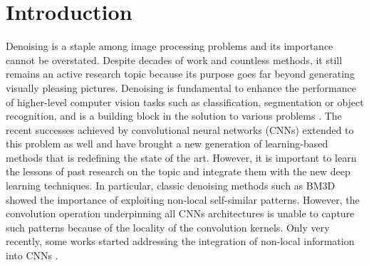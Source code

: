 \documentclass[journal]{IEEEtran}
\begin{document}
\section{Introduction}


Denoising is a staple among image processing problems and its importance cannot be overstated. Despite decades of work and countless methods, it still remains an active research topic because its purpose goes far beyond generating visually pleasing pictures. Denoising is fundamental to enhance the performance of higher-level computer vision tasks such as classification, segmentation or object recognition, and is a building block in the solution to various problems \cite{lukavs2006digital,valsesia2015compressed,romano2017little,sun2019block}. The recent successes achieved by convolutional neural networks (CNNs) extended to this problem as well and have brought a new generation of learning-based methods that is redefining the state of the art. However, it is important to learn the lessons of past research on the topic and integrate them with the new deep learning techniques. In particular, classic denoising methods such as BM3D \cite{dabov2007image} showed the importance of exploiting non-local self-similar patterns. However, the convolution operation underpinning all CNNs architectures \cite{zhang2017beyond,mao2016image,tai2017memnet,bae2017beyond} is unable to capture such patterns because of the locality of the convolution kernels. Only very recently, some works started addressing the integration of non-local information into CNNs \cite{cruz2018nonlocality,lefkimmiatis2018universal,plotz2018neural,liu2018non}.
\end{document}
